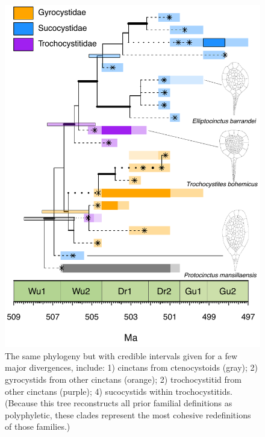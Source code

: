 \documentclass{article}
\begin{document}
\begin{figure}
  \includegraphics[width=\textwidth]{figures/Pretty Cinctan Divergence Uncertainty_DFW_edits.pdf} 
  
  \caption{The same phylogeny but with credible intervals given for a few major divergences, include: 1) cinctans from ctenocystoids (gray); 2)  gyrocystids from other cinctans (orange);  2)  trochocystitid from other cinctans (purple);  4) sucocystids within trochocystitids.  (Because this tree reconstructs all prior familial definitions as polyphyletic, these clades represent the most cohesive redefinitions of those families.)}
\end{figure}
\end{document}
